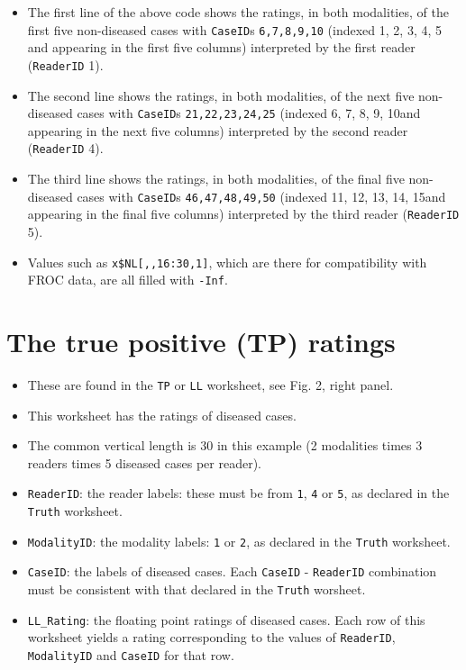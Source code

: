 \documentclass[]{book}
\providecommand{\tightlist}{%
  \setlength{\itemsep}{0pt}\setlength{\parskip}{0pt}}
\begin{document}
\begin{itemize}
\tightlist
\item
  The first line of the above code shows the ratings, in both modalities, of the first five non-diseased cases with \texttt{CaseID}s \texttt{6,7,8,9,10} (indexed 1, 2, 3, 4, 5 and appearing in the first five columns) interpreted by the first reader (\texttt{ReaderID} 1).
\item
  The second line shows the ratings, in both modalities, of the next five non-diseased cases with \texttt{CaseID}s \texttt{21,22,23,24,25} (indexed 6, 7, 8, 9, 10and appearing in the next five columns) interpreted by the second reader (\texttt{ReaderID} 4).
\item
  The third line shows the ratings, in both modalities, of the final five non-diseased cases with \texttt{CaseID}s \texttt{46,47,48,49,50} (indexed 11, 12, 13, 14, 15and appearing in the final five columns) interpreted by the third reader (\texttt{ReaderID} 5).
\item
  Values such as \texttt{x\$NL{[},,16:30,1{]}}, which are there for compatibility with FROC data, are all filled with \texttt{-Inf}.
\end{itemize}

\hypertarget{the-true-positive-tp-ratings-2}{%
\section{The true positive (TP) ratings}\label{the-true-positive-tp-ratings-2}}

\begin{itemize}
\tightlist
\item
  These are found in the \texttt{TP} or \texttt{LL} worksheet, see Fig. 2, right panel.
\item
  This worksheet has the ratings of diseased cases.
\item
  The common vertical length is 30 in this example (2 modalities times 3 readers times 5 diseased cases per reader).
\item
  \texttt{ReaderID}: the reader labels: these must be from \texttt{1}, \texttt{4} or \texttt{5}, as declared in the \texttt{Truth} worksheet.
\item
  \texttt{ModalityID}: the modality labels: \texttt{1} or \texttt{2}, as declared in the \texttt{Truth} worksheet.
\item
  \texttt{CaseID}: the labels of diseased cases. Each \texttt{CaseID} - \texttt{ReaderID} combination must be consistent with that declared in the \texttt{Truth} worsheet.\\
\item
  \texttt{LL\_Rating}: the floating point ratings of diseased cases. Each row of this worksheet yields a rating corresponding to the values of \texttt{ReaderID}, \texttt{ModalityID} and \texttt{CaseID} for that row.
\end{itemize}
\end{document}
